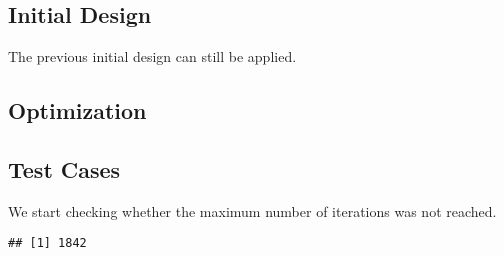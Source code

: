 \documentclass[]{book}
\newenvironment{Shaded}{\begin{snugshade}}{\end{snugshade}}
\newcommand{\DataTypeTok}[1]{\textcolor[rgb]{0.13,0.29,0.53}{#1}}
\newcommand{\DecValTok}[1]{\textcolor[rgb]{0.00,0.00,0.81}{#1}}
\newcommand{\KeywordTok}[1]{\textcolor[rgb]{0.13,0.29,0.53}{\textbf{#1}}}
\newcommand{\NormalTok}[1]{#1}
\newcommand{\OperatorTok}[1]{\textcolor[rgb]{0.81,0.36,0.00}{\textbf{#1}}}
\newcommand{\StringTok}[1]{\textcolor[rgb]{0.31,0.60,0.02}{#1}}
\begin{document}
\hypertarget{initial-design-4}{%
\subsection{Initial Design}\label{initial-design-4}}

The previous initial design can still be applied.

\hypertarget{optimization-5}{%
\subsection{Optimization}\label{optimization-5}}

\begin{Shaded}
\end{Shaded}

\hypertarget{test-cases-5}{%
\subsection{Test Cases}\label{test-cases-5}}

We start checking whether the maximum number of iterations was not reached.

\begin{Shaded}
\end{Shaded}

\begin{verbatim}
## [1] 1842
\end{verbatim}

\begin{Shaded}
\end{Shaded}
\end{document}
